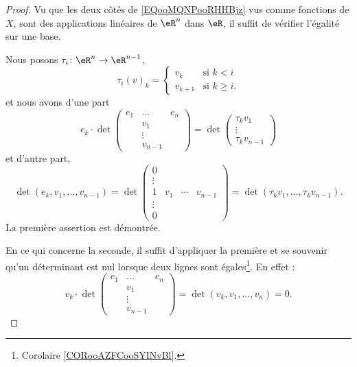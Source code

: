 \begin{proof}
    Vu que les deux côtés de \eqref{EQooMQNPooRHHBjz} vus comme fonctions de \( X\), sont des applications linéaires de \( \eR^n\) dans \( \eR\), il suffit de vérifier l'égalité sur une base.

    Nous posons \( \tau_i\colon \eR^n\to \eR^{n-1}\),
    \begin{equation}
        \tau_i(v)_k=\begin{cases}
            v_k    &   \text{si } k<i\\
            v_{k+1}    &    \text{si } k\geq i\text{.}
        \end{cases}
    \end{equation}
    et nous avons d'une part
    \begin{equation}
        e_k\cdot
                \det
                \begin{pmatrix}
                     e_1   &   \ldots    &   e_n    \\
                        &   v_1    &       \\
                        &   \vdots    &       \\
                        &   v_{n-1}    &
                 \end{pmatrix}
                 =\det\begin{pmatrix}
                     \tau_kv_1   \\
                     \vdots   \\
                     \tau_kv_{n-1}
                 \end{pmatrix}
            \end{equation}
     et d'autre part,
     \begin{equation}
         \det(e_k,v_1,\ldots, v_{n-1})=\det
         \begin{pmatrix}
             0&&&\\
             \vdots&&&\\
             1&v_1&\cdots&v_{n-1}\\
             \vdots&&&\\
             0&&&
         \end{pmatrix}=\det(\tau_k v_1,\ldots, \tau_k v_{n-1}).
     \end{equation}
     La première assertion est démontrée.

     En ce qui concerne la seconde, il suffit d'appliquer la première et se souvenir qu'un déterminant est nul lorsque deux lignes sont égales\footnote{Corolaire \ref{CORooAZFCooSYINvBl}.}. En effet :
     \begin{equation}
         v_k\cdot \det
                \begin{pmatrix}
                     e_1   &   \ldots    &   e_n    \\
                        &   v_1    &       \\
                        &   \vdots    &       \\
                        &   v_{n-1}    &
                 \end{pmatrix}
                 =
                 \det(v_k,v_1,\ldots, v_n)=0.
     \end{equation}
\end{proof}
